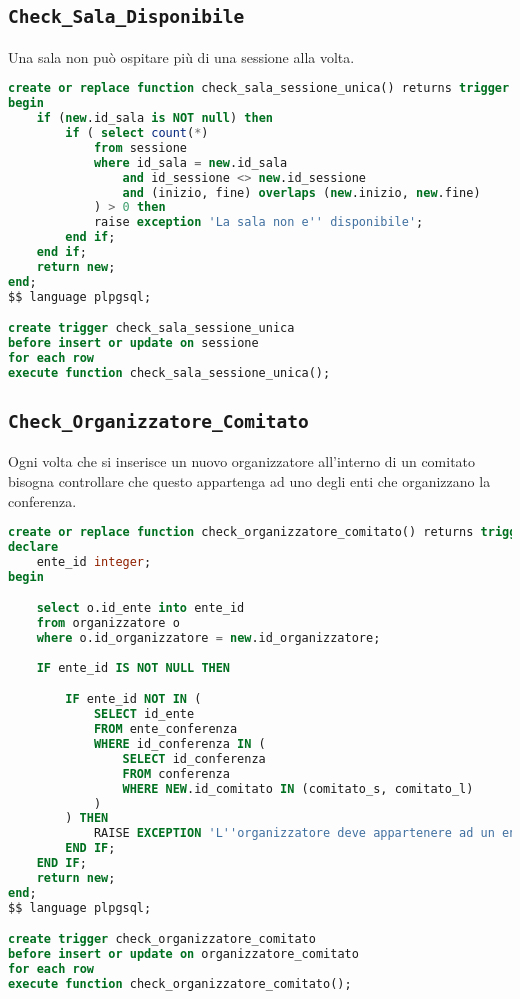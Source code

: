 \subsection{\texttt{Check\_Sala\_Disponibile}}\label{trigger:saladisponibile}
Una sala non può ospitare più di una sessione alla volta.
\begin{lstlisting}[caption={\texttt{Check\_sala\_sessione\_unica}}, language=SQL, style=mystyle]
create or replace function check_sala_sessione_unica() returns trigger as $$
begin
    if (new.id_sala is NOT null) then
        if ( select count(*) 
            from sessione 
            where id_sala = new.id_sala 
                and id_sessione <> new.id_sessione
                and (inizio, fine) overlaps (new.inizio, new.fine)
            ) > 0 then
            raise exception 'La sala non e'' disponibile';
        end if;
    end if;
    return new;
end;
$$ language plpgsql;

create trigger check_sala_sessione_unica
before insert or update on sessione
for each row
execute function check_sala_sessione_unica();
\end{lstlisting}
\subsection{\texttt{Check\_Organizzatore\_Comitato}}\label{trigger:check_organizzatore_comitato}
Ogni volta che si inserisce un nuovo organizzatore all'interno di un comitato bisogna controllare che questo appartenga ad uno degli enti che organizzano la conferenza.
\begin{lstlisting}[language=SQL, style=mystyle, caption={\texttt{Check\_organizzatori\_comitato}}]
create or replace function check_organizzatore_comitato() returns trigger as $$
declare
    ente_id integer;
begin

    select o.id_ente into ente_id
    from organizzatore o
    where o.id_organizzatore = new.id_organizzatore;
    
    IF ente_id IS NOT NULL THEN

        IF ente_id NOT IN (
            SELECT id_ente
            FROM ente_conferenza
            WHERE id_conferenza IN (
                SELECT id_conferenza
                FROM conferenza
                WHERE NEW.id_comitato IN (comitato_s, comitato_l)
            )
        ) THEN
            RAISE EXCEPTION 'L''organizzatore deve appartenere ad un ente che ha organizzato la conferenza';
        END IF;
    END IF;
    return new;
end;
$$ language plpgsql;

create trigger check_organizzatore_comitato
before insert or update on organizzatore_comitato
for each row
execute function check_organizzatore_comitato();
\end{lstlisting}
